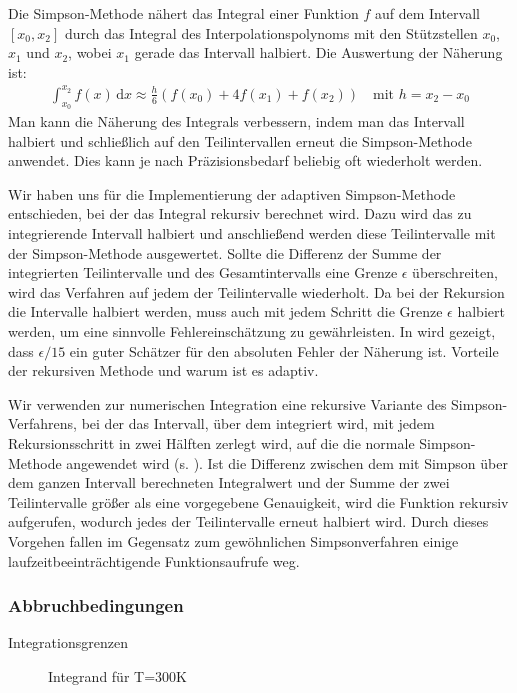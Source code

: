 \documentclass[10pt,a4paper]{article}
\begin{document}
Die Simpson-Methode nähert das Integral einer Funktion $f$ auf dem Intervall $[x_0,x_2]$ durch das Integral des Interpolationspolynoms mit den Stützstellen $x_0$, $x_1$ und $x_2$, wobei $x_1$ gerade das Intervall halbiert. Die Auswertung der Näherung ist:
\begin{align}
  \int_{x_0}^{x_2} f(x) \, \mathrm{d}x \approx \frac{h}{6} \left( f(x_0) + 4 f(x_1) + f(x_2) \right) \quad \text{mit } h = x_2 - x_0
\end{align}
Man kann die Näherung des Integrals verbessern, indem man das Intervall halbiert und schließlich auf den Teilintervallen erneut die Simpson-Methode anwendet. Dies kann je nach Präzisionsbedarf beliebig oft wiederholt werden.

Wir haben uns für die Implementierung der adaptiven Simpson-Methode entschieden, bei der das Integral rekursiv berechnet wird. Dazu wird das zu integrierende Intervall halbiert und anschließend werden diese Teilintervalle mit der Simpson-Methode ausgewertet. Sollte die Differenz der Summe der integrierten Teilintervalle und des Gesamtintervalls eine Grenze $\epsilon$ überschreiten, wird das Verfahren auf jedem der Teilintervalle wiederholt. Da bei der Rekursion die Intervalle halbiert werden, muss auch mit jedem Schritt die Grenze $\epsilon$ halbiert werden, um eine sinnvolle Fehlereinschätzung zu gewährleisten. In \cite{lyness} wird gezeigt, dass $\epsilon / 15$ ein guter Schätzer für den absoluten Fehler der Näherung ist. Vorteile der rekursiven Methode und warum ist es adaptiv.
 

Wir verwenden zur numerischen Integration eine rekursive Variante des Simpson-Verfahrens, bei der das Intervall, über dem integriert wird, mit jedem Rekursionsschritt in zwei Hälften zerlegt wird, auf die die normale Simpson-Methode angewendet wird (s. \cite{lyness}). Ist die Differenz zwischen dem mit Simpson über dem ganzen Intervall berechneten Integralwert und der Summe der zwei Teilintervalle größer als eine vorgegebene Genauigkeit, wird die Funktion rekursiv aufgerufen, wodurch jedes der Teilintervalle erneut halbiert wird. Durch dieses Vorgehen fallen im Gegensatz zum gewöhnlichen Simpsonverfahren einige laufzeitbeeinträchtigende Funktionsaufrufe weg.

\subsubsection{Abbruchbedingungen}

Integrationsgrenzen
\begin{figure}[htbp]
\centering

\caption{Integrand für T=300K}
\end{figure}
\end{document}
